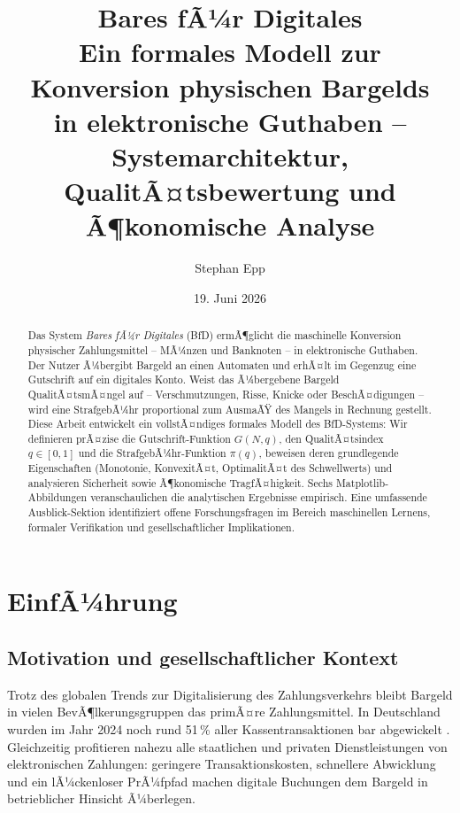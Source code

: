 ﻿\documentclass[a4paper,12pt]{article}
\title{\textbf{Bares fÃ¼r Digitales}\\[0.4em]
\large Ein formales Modell zur Konversion physischen Bargelds\\
in elektronische Guthaben -- Systemarchitektur,\\
QualitÃ¤tsbewertung und Ã¶konomische Analyse}
\author{Stephan Epp}
\date{19. Juni 2026}
\theoremstyle{definition}
\begin{document}
\sloppy

\maketitle

\begin{abstract}
Das System \emph{Bares fÃ¼r Digitales} (BfD) ermÃ¶glicht die maschinelle Konversion physischer
Zahlungsmittel -- MÃ¼nzen und Banknoten -- in elektronische Guthaben.
Der Nutzer Ã¼bergibt Bargeld an einen Automaten und erhÃ¤lt im Gegenzug eine Gutschrift
auf ein digitales Konto.  Weist das Ã¼bergebene Bargeld QualitÃ¤tsmÃ¤ngel auf --
Verschmutzungen, Risse, Knicke oder BeschÃ¤digungen -- wird eine StrafgebÃ¼hr
proportional zum AusmaÃŸ des Mangels in Rechnung gestellt.
Diese Arbeit entwickelt ein vollstÃ¤ndiges formales Modell des BfD-Systems:
Wir definieren prÃ¤zise die Gutschrift-Funktion $G(N, q)$, den QualitÃ¤tsindex $q \in [0,1]$
und die StrafgebÃ¼hr-Funktion $\pi(q)$, beweisen deren grundlegende Eigenschaften (Monotonie,
KonvexitÃ¤t, OptimalitÃ¤t des Schwellwerts) und analysieren Sicherheit sowie Ã¶konomische
TragfÃ¤higkeit.  Sechs Matplotlib-Abbildungen veranschaulichen die analytischen Ergebnisse
empirisch.  Eine umfassende Ausblick-Sektion identifiziert offene Forschungsfragen
im Bereich maschinellen Lernens, formaler Verifikation und gesellschaftlicher Implikationen.
\end{abstract}

\tableofcontents
\newpage

\section{EinfÃ¼hrung}

\subsection{Motivation und gesellschaftlicher Kontext}

Trotz des globalen Trends zur Digitalisierung des Zahlungsverkehrs bleibt Bargeld
in vielen BevÃ¶lkerungsgruppen das primÃ¤re Zahlungsmittel.
In Deutschland wurden im Jahr 2024 noch rund 51\,\% aller Kassentransaktionen bar
abgewickelt \cite{bundesbank2024}.
Gleichzeitig profitieren nahezu alle staatlichen und privaten Dienstleistungen
von elektronischen Zahlungen: geringere Transaktionskosten, schnellere Abwicklung
und ein lÃ¼ckenloser PrÃ¼fpfad machen digitale Buchungen dem Bargeld in betrieblicher
Hinsicht Ã¼berlegen.
\end{document}
